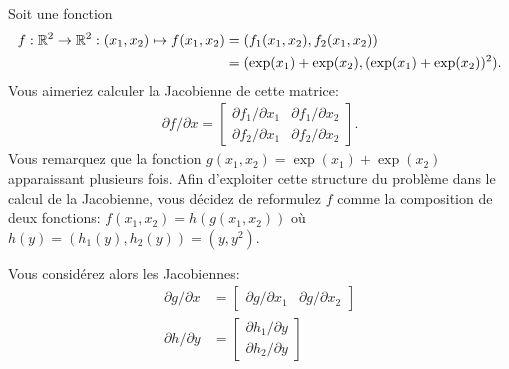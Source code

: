 Soit une fonction
\begin{align*}
    f: \mathbb{R}^2 \to \mathbb{R}^2: (x_1,x_2) \mapsto
    f(x_1,x_2) & = (f_1(x_1, x_2), f_2(x_1, x_2))\\
    & = (\exp(x_1) + \exp(x_2), (\exp(x_1) + \exp(x_2))^2).
\end{align*}
Vous aimeriez calculer la Jacobienne de cette matrice:
\begin{align*}
    \partial f / \partial x =
    \begin{bmatrix}
        \partial f_1 / \partial x_1 & \partial f_1 / \partial x_2\\
        \partial f_2 / \partial x_1 & \partial f_2 / \partial x_2
    \end{bmatrix}.
\end{align*}
Vous remarquez que la fonction $g(x_1, x_2) = \exp(x_1) + \exp(x_2)$ apparaissant plusieurs fois.
Afin d'exploiter cette structure du problème dans le calcul de la Jacobienne,
vous décidez de reformulez $f$ comme la composition de deux fonctions:
$f(x_1, x_2) = h(g(x_1, x_2))$ où $h(y) = (h_1(y), h_2(y)) = (y, y^2)$.

Vous considérez alors les Jacobiennes:
\begin{align*}
    \partial g / \partial x & = \begin{bmatrix}
        \partial g / \partial x_1 & \partial g / \partial x_2
    \end{bmatrix}\\
    \partial h / \partial y & = \begin{bmatrix}
        \partial h_1 / \partial y \\ \partial h_2 / \partial y
    \end{bmatrix}
\end{align*}

